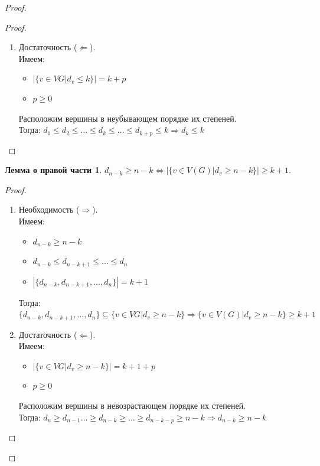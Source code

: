 \documentclass[10pt,a4paper]{article}
\begin{document}
\begin{enumerate}
\begin{proof}
\begin{proof}
\begin{enumerate}
	\item
	Достаточность ($\Leftarrow$).\\
	Имеем:
	\begin{itemize}
	\item $|\{ v \in VG | d_v \leq k \}| = k + p$
	\item $p \geq 0$
	\end{itemize}
	Расположим вершины в неубывающем порядке их степеней.\\
	Тогда: $d_1 \leq d_2 \leq \ldots \leq d_k \leq \ldots \leq d_{k + p} \leq k \Rightarrow d_k \leq k$
	\end{enumerate}
	\qedhere
	\end{proof}	
	
	\newtheorem*{lemma3}{Лемма о правой части}
	\begin{lemma3}
	$d_{n - k} \geq n - k \Leftrightarrow |\{ v \in V(G) | d_v \geq n - k \}| \geq k + 1.$
	\end{lemma3}
	\begin{proof} 	
	\begin{enumerate}
	\item
	Необходимость ($\Rightarrow$).\\
	Имеем:
	\begin{itemize}
	\item $d_{n - k} \geq n - k$
	\item $d_{n - k} \leq d_{n - k + 1} \leq \ldots \leq d_n$
	\item $|\{ d_{n - k}, d_{n - k + 1}, \ldots , d_n \}| = k + 1$
	\end{itemize}
	Тогда: $\{ d_{n - k}, d_{n - k + 1}, \ldots , d_n \} \subseteq \{ v \in VG | d_v \geq n - k \} \Rightarrow \{ v \in V(G) | d_v \geq n - k \} \geq k + 1$
	
	\item
	Достаточность ($\Leftarrow$).\\
	Имеем:
	\begin{itemize}
	\item $|\{ v \in VG | d_v \geq n - k \}| = k + 1 + p$
	\item $p \geq 0$
	\end{itemize}
	Расположим вершины в невозрастающем порядке их степеней.\\
	Тогда: $d_n \geq d_{n - 1} \ldots \geq d_{n - k} \geq \ldots \geq d_{n - k - p} \geq n - k \Rightarrow d_{n - k} \geq n - k$
	\end{enumerate}
	\qedhere
	\end{proof}
	

\end{proof}
\end{enumerate}
\end{document}

